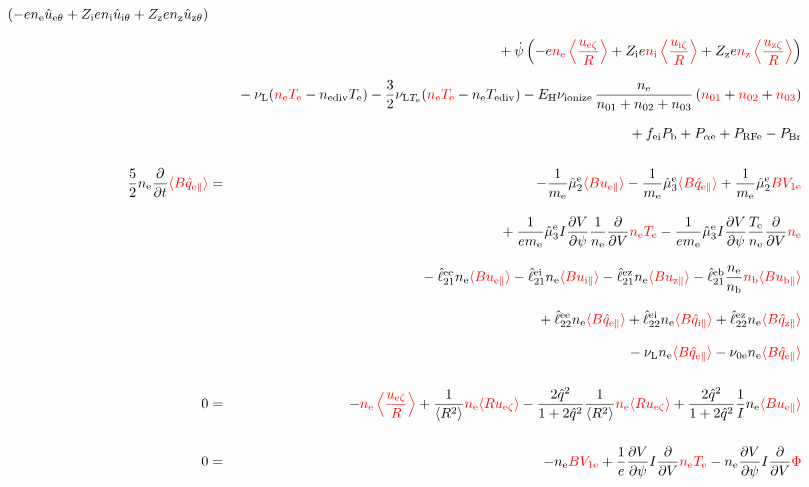 \documentclass[11pt]{article}
\def\r#1{{\rm#1}}
\def\ave#1{\left\langle#1\right\rangle}
\def\aves#1{\langle#1\rangle}
\def\dd#1#2{\frac{\partial #1}{\partial #2}}
\def\para{\parallel}
\def\ddV{\frac{\partial}{\partial V}}
\def\ddt{\frac{\partial}{\partial t}}
\def\me{m_\r{e}}
\def\mb{m_\r{b}}
\def\nee{n_\r{e}}
\def\ni{n_\r{i}}
\def\nz{n_\r{z}}
\def\nb{n_\r{b}}
\def\Te{T_\r{e}}
\def\Zi{Z_\r{i}}
\def\Zz{Z_\r{z}}
\def\uzt#1{u_{\r{#1}\zeta}}
\def\upara#1{u_{\r{#1}\para}}
\def\uhatth#1{\hat{u}_{\r{#1}\theta}}
\def\qhatpara#1{\hat{q}_{\r{#1}\para}}
\def\nun#1{\nu_\r{0#1}}
\def\ndiv#1{n_\r{#1div}}
\def\Tdiv#1{T_\r{#1div}}
\def\nuLT#1{\nu_{\r{L}T_\r{#1}}}
\def\PRF#1{P_\r{RF#1}}
\def\Palp#1{P_{\alpha\r{#1}}}
\def\fei{f_\r{ei}}
\def\PBr{P_\r{Br}}
\def\Pb{P_\r{b}}
\def\Eb{E_\r{b}}
\def\EH{E_\r{H}}
\def\nna{n_{01}}
\def\nnb{n_{02}}
\def\nnc{n_{03}}
\def\nuL{\nu_\r{L}}
\def\nuion{\nu_\r{ionize}}
\def\red#1{\textcolor{red}{#1}}
\begin{document}
\begin{eqnarray}
  (-    e \nee \uhatth{e} + \Zi e \ni  \uhatth{i} + \Zz e \nz  \uhatth{z})
%
\nonumber\\[2.5mm]&&{}
%
  +\dot{\psi}\left(-     e \red{\nee \ave{\frac{\uzt{e}}{R}}}
	           + \Zi e \red{\ni  \ave{\frac{\uzt{i}}{R}}}
	           + \Zz e \red{\nz  \ave{\frac{\uzt{z}}{R}}}\right)
\nonumber\\[2.5mm]&&{}
%
  - \nuL (\red{\nee\Te} - \ndiv{e}\Te)
%
  - \frac{3}{2} \nuLT{e} (\red{\nee\Te} - \nee\Tdiv{e})
%
  - \EH \nuion\, \frac{\nee}{\nna + \nnb + \nnc}\, (\red{\nna} + \red{\nnb} + \red{\nnc})
\nonumber\\[2.5mm]&&{}
%
  + \fei \Pb
%
%
  + \Palp{e}
%
  + \PRF{e}
%
  - \PBr
\\[5mm]
 \frac{5}{2} \nee \ddt \red{\aves{B \qhatpara{e}}} &=&
%
  - \frac{1}{\me} \hat{\mu}_2^\r{e} \red{\aves{B \upara{e}}}
  - \frac{1}{\me} \hat{\mu}_3^\r{e} \red{\aves{B \qhatpara{e}}}
%
  + \frac{1}{\me} \hat{\mu}_2^\r{e} \red{B V_{1\r{e}}}
\nonumber\\[3mm]&&{}
%
  + \frac{1}{e\me} \hat{\mu}_3^\r{e} I \dd{V}{\psi} \frac{1}{\nee} \ddV
  \red{\nee \Te}
  - \frac{1}{e\me} \hat{\mu}_3^\r{e} I \dd{V}{\psi} \frac{\Te}{\nee} \ddV
  \red{\nee}
\nonumber\\[3mm]&&{}
%
  - \hat{\ell}_{21}^{\r{ee}} \nee \red{\aves{B \upara{e}}}
  - \hat{\ell}_{21}^{\r{ei}} \nee \red{\aves{B \upara{i}}}
  - \hat{\ell}_{21}^{\r{ez}} \nee \red{\aves{B \upara{z}}}
  - \hat{\ell}_{21}^{\r{eb}} \frac{\nee}{\nb} \red{\nb \aves{B \upara{b}}}
\nonumber\\[3mm]&&{}
%
  + \hat{\ell}_{22}^{\r{ee}} \nee \red{\aves{B \qhatpara{e}}}
  + \hat{\ell}_{22}^{\r{ei}} \nee \red{\aves{B \qhatpara{i}}}
  + \hat{\ell}_{22}^{\r{ez}} \nee \red{\aves{B \qhatpara{z}}}
\nonumber\\[3mm]&&{}
%
  - \nuL \nee \red{\aves{B \qhatpara{e}}}
%
  - \nun{e} \nee \red{\aves{B \qhatpara{e}}}
\\[5mm]
    0 &=&
%
  - \red{\nee \ave{\frac{\uzt{e}}{R}}}
%
  + \frac{1}{\aves{R^2}} \red{\nee \aves{R\uzt{e}}}
%
  - \frac{2\hat{q}^2}{1+2\hat{q}^2} \frac{1}{\aves{R^2}}\red{\nee\aves{R\uzt{e}}}
%
  + \frac{2\hat{q}^2}{1+2\hat{q}^2} \frac{1}{I}\nee \red{\aves{B\upara{e}}}
\\[5mm]
    0 &=&
%
  - \nee \red{BV_{1\r{e}}}
%
  + \frac{1}{e} \dd{V}{\psi} I \ddV \red{\nee\Te}
%
  - \nee \dd{V}{\psi} I \ddV \red{\Phi}
\end{eqnarray}
%
\end{document}
